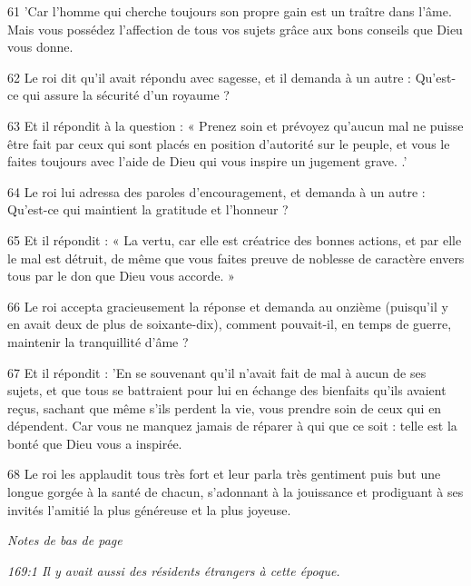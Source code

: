 \par 61 'Car l'homme qui cherche toujours son propre gain est un traître dans l'âme. Mais vous possédez l'affection de tous vos sujets grâce aux bons conseils que Dieu vous donne.

\par 62 Le roi dit qu'il avait répondu avec sagesse, et il demanda à un autre : Qu'est-ce qui assure la sécurité d'un royaume ?

\par 63 Et il répondit à la question : « Prenez soin et prévoyez qu'aucun mal ne puisse être fait par ceux qui sont placés en position d'autorité sur le peuple, et vous le faites toujours avec l'aide de Dieu qui vous inspire un jugement grave. .'

\par 64 Le roi lui adressa des paroles d'encouragement, et demanda à un autre : Qu'est-ce qui maintient la gratitude et l'honneur ?

\par 65 Et il répondit : « La vertu, car elle est créatrice des bonnes actions, et par elle le mal est détruit, de même que vous faites preuve de noblesse de caractère envers tous par le don que Dieu vous accorde. »

\par 66 Le roi accepta gracieusement la réponse et demanda au onzième (puisqu'il y en avait deux de plus de soixante-dix), comment pouvait-il, en temps de guerre, maintenir la tranquillité d'âme ?

\par 67 Et il répondit : 'En se souvenant qu'il n'avait fait de mal à aucun de ses sujets, et que tous se battraient pour lui en échange des bienfaits qu'ils avaient reçus, sachant que même s'ils perdent la vie, vous prendre soin de ceux qui en dépendent. Car vous ne manquez jamais de réparer à qui que ce soit : telle est la bonté que Dieu vous a inspirée.

\par 68 Le roi les applaudit tous très fort et leur parla très gentiment puis but une longue gorgée à la santé de chacun, s'adonnant à la jouissance et prodiguant à ses invités l'amitié la plus généreuse et la plus joyeuse.

\par \textit{Notes de bas de page}

\par \textit{169:1 Il y avait aussi des résidents étrangers à cette époque.}


